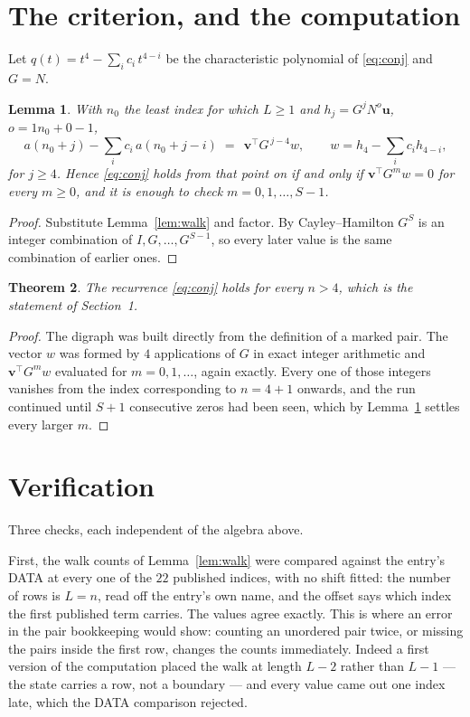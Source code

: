 \documentclass[11pt,a4paper]{article}
\theoremstyle{plain}
\newtheorem{theorem}{Theorem}
\newtheorem{lemma}[theorem]{Lemma}
\theoremstyle{definition}
\begin{document}
\section{The criterion, and the computation}

Let $q(t)=t^{4}-\sum_i c_i\,t^{4-i}$ be the characteristic polynomial of
\eqref{eq:conj} and $G=N$.

\begin{lemma}\label{lem:crit}
With $n_0$ the least index for which $L\ge1$ and $h_j=G^{j}N^{o}\mathbf{u}$,
$o=1n_0+0-1$,
\[
a(n_0+j)-\sum_i c_i\,a(n_0+j-i)\;=\;\,\mathbf{v}^{\!\top}G^{\,j-4}w,
\qquad w=h_{4}-\sum_i c_i h_{4-i},
\]
for $j\ge4$. Hence \eqref{eq:conj} holds from that point on if and only if
$\mathbf{v}^{\!\top}G^{m}w=0$ for every $m\ge0$, and it is enough to check
$m=0,1,\dots,S-1$.
\end{lemma}

\begin{proof}
Substitute Lemma~\ref{lem:walk} and factor. By Cayley--Hamilton $G^{S}$ is an integer
combination of $I,G,\dots,G^{S-1}$, so every later value is the same combination of earlier
ones.
\end{proof}

\begin{theorem}
The recurrence \eqref{eq:conj} holds for every $n>4$, which is the statement of
Section~1.
\end{theorem}

\begin{proof}
The digraph was built directly from the definition of a marked pair. The vector $w$ was
formed by $4$ applications of $G$ in exact integer arithmetic and
$\mathbf{v}^{\!\top}G^{m}w$ evaluated for $m=0,1,\dots$, again exactly. Every one of
those integers vanishes from the index corresponding to $n=4+1$ onwards, and the run
continued until $S+1$ consecutive zeros had been seen, which by Lemma~\ref{lem:crit}
settles every larger $m$.
\end{proof}

\section{Verification}

Three checks, each independent of the algebra above.

First, the walk counts of Lemma~\ref{lem:walk} were compared against the entry's DATA at
every one of the $22$ published indices, with no shift fitted: the number of rows is
$L=n$, read off the entry's own name, and the offset says which index the first
published term carries. The values agree exactly. This is where an error in the pair
bookkeeping would show: counting an unordered pair twice, or missing the pairs inside the
first row, changes the counts immediately. Indeed a first version of the computation
placed the walk at length $L-2$ rather than $L-1$ --- the state carries a row, not a
boundary --- and every value came out one index late, which the DATA comparison rejected.
\end{document}
